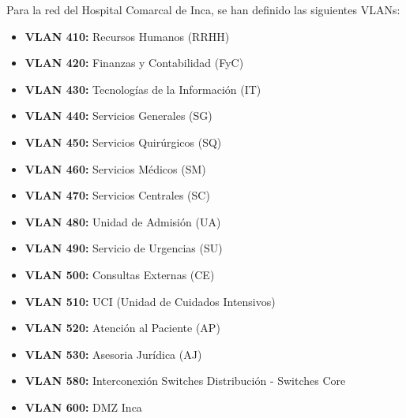 Para la red del Hospital Comarcal de Inca, se han definido las siguientes VLANs:
\begin{itemize}
    \item \textbf{VLAN 410:} Recursos Humanos (RRHH)
    \item \textbf{VLAN 420:} Finanzas y Contabilidad (FyC)
    \item \textbf{VLAN 430:} Tecnologías de la Información (IT)
    \item \textbf{VLAN 440:} Servicios Generales (SG)
    \item \textbf{VLAN 450:} Servicios Quirúrgicos (SQ)
    \item \textbf{VLAN 460:} Servicios Médicos (SM)
    \item \textbf{VLAN 470:} Servicios Centrales (SC)
    \item \textbf{VLAN 480:} Unidad de Admisión (UA)
    \item \textbf{VLAN 490:} Servicio de Urgencias (SU)
    \item \textbf{VLAN 500:} Consultas Externas (CE)
    \item \textbf{VLAN 510:} UCI (Unidad de Cuidados Intensivos)
    \item \textbf{VLAN 520:} Atención al Paciente (AP)
    \item \textbf{VLAN 530:} Asesoria Jurídica (AJ)
    \item \textbf{VLAN 580:} Interconexión Switches Distribución - Switches Core
    \item \textbf{VLAN 600:} DMZ Inca
\end{itemize}

